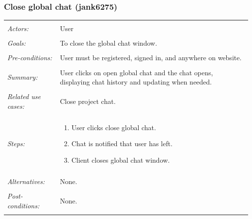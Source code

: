 \documentclass[11pt]{report}
\begin{document}
\subsubsection{Close global chat (jank6275)}
\begin{tabular}{ p{2cm} p{12cm} }
 \hline
 \\
 \textit{Actors:} & User \\ 
 \\
 \textit{Goals:} & To close the global chat window. \\
 \\
 \textit{Pre-conditions:} & User must be registered, signed in, and anywhere on website.  \\
 \\
 \textit{Summary:} & User clicks on open global chat and the chat opens, displaying chat history and updating when needed. \\ 
 \\
 \textit{Related use cases:} & Close project chat. \\ 
 \\
 \textit{Steps:} & \begin{enumerate}
  \item User clicks close global chat.
  \item Chat is notified that user has left.
  \item Client closes global chat window.
 \end{enumerate} \\
 \\
 \textit{Alternatives:} & None. \\
 \\
 \textit{Post-conditions:} & None. \\
 \\
\hline
\end{tabular}
\end{document}

